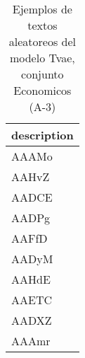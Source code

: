 \begin{table}[H]
\centering
\fontsize{8}{14}\selectfont
\caption{Ejemplos de textos aleatoreos del modelo Tvae, conjunto Economicos (A-3)}
\label{table-sample10-economicos-a-3-tvae-text}
\begin{tabular}{|m{50em}|}
\hline
\rowcolor[gray]{0.8}
description \\
\hline AAAMo \\
\hline AAHvZ \\
\hline AADCE \\
\hline AADPg \\
\hline AAFfD \\
\hline AADyM \\
\hline AAHdE \\
\hline AAETC \\
\hline AADXZ \\
\hline AAAmr \\
\hline
\end{tabular}
\end{table}
